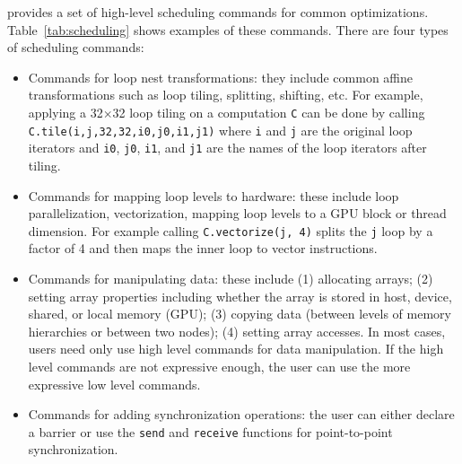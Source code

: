 \framework provides a set of high-level scheduling commands for common optimizations. Table~\ref{tab:scheduling} shows examples of these commands.  There are four types of scheduling commands:
\begin{itemize}
    \item Commands for loop nest transformations: they include common affine transformations such as loop tiling, splitting, shifting, etc.  For example, applying a 32$\times$32 loop tiling on a computation \texttt{C} can be done by calling\\ \texttt{C.tile(i,j,32,32,i0,j0,i1,j1)} where \texttt{i} and \texttt{j} are the original loop iterators and \texttt{i0}, \texttt{j0}, \texttt{i1}, and \texttt{j1} are the names of the loop iterators after tiling.

    \item Commands for mapping loop levels to hardware: these include loop parallelization, vectorization, mapping loop levels to a GPU block or thread dimension. For example calling \texttt{C.vectorize(j, 4)} splits the \texttt{j} loop by a factor of 4 and then maps the inner loop to vector  instructions.

    \item Commands for manipulating data: these include (1) allocating arrays; (2) setting array properties including whether the array is stored in host, device, shared, or local memory (GPU); (3) copying data (between levels of memory hierarchies or between two nodes);  (4) setting array accesses. In most cases, users need only use high level commands for data manipulation. If the high level commands are not expressive enough, the user can use the more expressive low level commands.

    \item Commands for adding synchronization operations: the user can either declare a barrier or use the \texttt{send} and \texttt{receive} functions for point-to-point synchronization.
\end{itemize}

